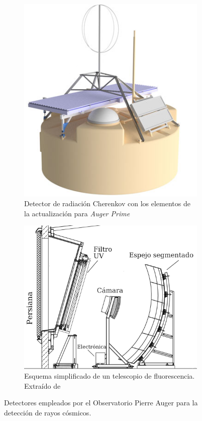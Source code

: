 \begin{figure}[H]
    \begin{subfigure}[t]{0.45\textwidth}
	\includegraphics[width=\textwidth]{tanque.png}
	\caption{Detector de radiación Cherenkov con los elementos de la actualización para \emph{Auger Prime}} 	\label{fig:tanque}
    \end{subfigure}%
    \hspace{\fill}
    \begin{subfigure}[t]{0.5\textwidth}
	\includegraphics[width=\textwidth]{fd.png}
	\caption{Esquema simplificado de un telescopio de fluorescencia. Extraído de \cite{kit_oracle}}
	\label{fig:FD}
    \end{subfigure}%
    \caption{Detectores empleados por el Observatorio Pierre Auger para la detección de rayos cósmicos.}
	\end{figure}
